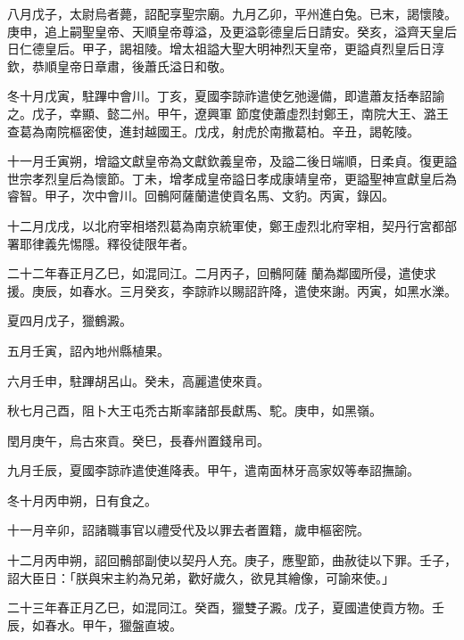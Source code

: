 \begin{pinyinscope}
 八月戊子，太尉烏者薨，詔配享聖宗廟。九月乙卯，平州進白兔。已末，謁懷陵。庚申，追上嗣聖皇帝、天順皇帝尊溢，及更溢彰德皇后日請安。癸亥，溢齊天皇后日仁德皇后。甲子，謁祖陵。增太祖謚大聖大明神烈天皇帝，更謚貞烈皇后日淳欽，恭順皇帝日章肅，後蕭氏溢日和敬。



 冬十月戊寅，駐蹕中會川。丁亥，夏國李諒祚遣使乞弛邊備，即遣蕭友括奉詔諭之。戊子，幸顯、懿二州。甲午，遼興軍
 節度使蕭虛烈封鄭王，南院大王、潞王查葛為南院樞密使，進封越國王。戊戌，射虎於南撒葛柏。辛丑，謁乾陵。



 十一月壬寅朔，增謚文獻皇帝為文獻欽義皇帝，及謚二後日端順，日柔貞。復更謚世宗孝烈皇后為懷節。丁未，增孝成皇帝謚日孝成康靖皇帝，更謚聖神宣獻皇后為睿智。甲子，次中會川。回鶻阿薩蘭遣使貢名馬、文豹。丙寅，錄囚。



 十二月戊戌，以北府宰相塔烈葛為南京統軍使，鄭王虛烈北府宰相，契丹行宮都部署耶律義先惕隱。釋役徒限年者。



 二十二年春正月乙巳，如混同江。二月丙子，回鶻阿薩
 蘭為鄰國所侵，遣使求援。庚辰，如春水。三月癸亥，李諒祚以賜詔許降，遣使來謝。丙寅，如黑水濼。



 夏四月戊子，獵鶴澱。



 五月壬寅，詔內地州縣植果。



 六月壬申，駐蹕胡呂山。癸未，高麗遣使來貢。



 秋七月己酉，阻卜大王屯禿古斯率諸部長獻馬、駝。庚申，如黑嶺。



 閏月庚午，烏古來貢。癸巳，長春州置錢帛司。



 九月壬辰，夏國李諒祚遣使進降表。甲午，遣南面林牙高家奴等奉詔撫諭。



 冬十月丙申朔，日有食之。



 十一月辛卯，詔諸職事官以禮受代及以罪去者置籍，歲申樞密院。



 十二月丙申朔，詔回鶻部副使以契丹人充。庚子，應聖節，曲赦徒以下罪。壬子，
 詔大臣日：「朕與宋主約為兄弟，歡好歲久，欲見其繪像，可諭來使。」



 二十三年春正月乙巳，如混同江。癸酉，獵雙子澱。戊子，夏國遣使貢方物。壬辰，如春水。甲午，獵盤直坡。




\end{pinyinscope}

